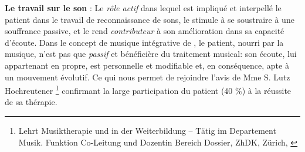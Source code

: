  \textbf{Le travail sur le son} :
 Le \emph{rôle actif} dans lequel est impliqué et interpellé le patient dans le travail
de reconnaissance de sons, le stimule à se soustraire à une souffrance
passive, et  le rend  \textit{contributeur} à son amélioration dans sa capacité
d'écoute.
Dans le concept de musique intégrative de \autocite[Cf.]
        {vrait_musicotherapie_2018}, le patient, nourri par
        la musique, n'est pas que \textit{passif }et
        bénéficière du traitement musical: son écoute, lui
        appartenant en propre, est personnelle et modifiable %
        et, en conséquence, apte à un mouvement évolutif.
Ce qui nous permet de rejoindre l'avis de Mme S. Lutz
 Hochreutener \footnote{ Lehrt Musiktherapie und in der Weiterbildung – Tätig
 im Departement Musik. Funktion Co-Leitung und Dozentin Bereich
  Dossier, ZhDK, Zürich, \autocite {lutz_hochreutener_spiel_2009} }
 confirmant la large participation du patient (40 \%) à la réussite de sa thérapie.

 
  


